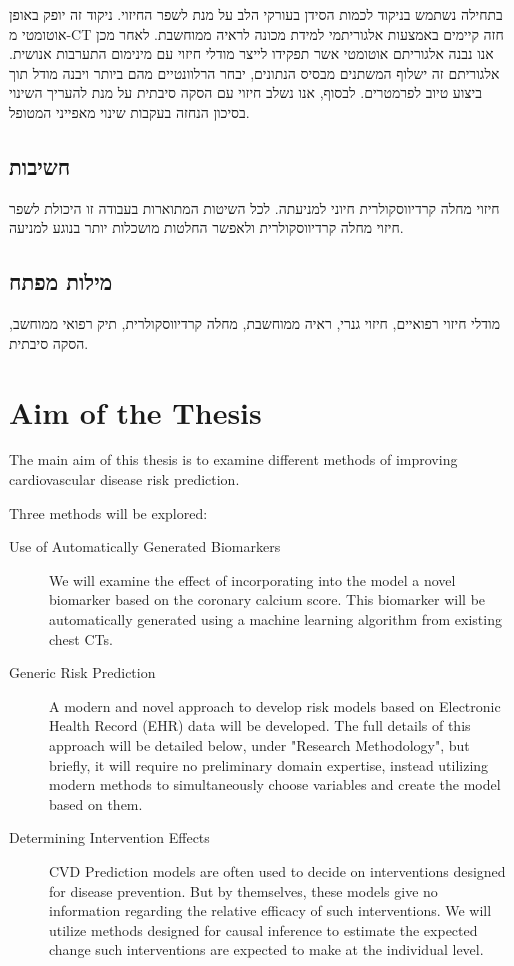 \documentclass[a4paper,12pt]{article}
\begin{document}
\begin{hebrew}
		בתחילה נשתמש בניקוד לכמות הסידן בעורקי הלב על מנת לשפר החיזוי. ניקוד זה יופק באופן אוטומטי מ-CT חזה קיימים באמצעות אלגוריתמי למידת מכונה לראיה ממוחשבת. לאחר מכן אנו נבנה אלגוריתם אוטומטי אשר תפקידו לייצר מודלי חיזוי עם מינימום התערבות אנושית. אלגוריתם זה ישלוף המשתנים מבסיס הנתונים, יבחר הרלוונטיים מהם ביותר ויבנה מודל תוך ביצוע טיוב לפרמטרים. לבסוף, אנו נשלב חיזוי עם הסקה סיבתית על מנת להעריך השינוי בסיכון הנחזה בעקבות שינוי מאפייני המטופל.

		\subsection{\texthebrew{חשיבות}}
		
		חיזוי מחלה קרדיווסקולרית חיוני למניעתה. לכל השיטות המתוארות בעבודה זו היכולת לשפר חיזוי מחלה קרדיווסקולרית ולאפשר החלטות מושכלות יותר בנוגע למניעה. 
			
			\subsection{\texthebrew{מילות מפתח}}
			
			מודלי חיזוי רפואיים, חיזוי גנרי, ראיה ממוחשבת, מחלה קרדיווסקולרית, תיק רפואי ממוחשב, הסקה סיבתית.
		
	\end{hebrew}
	
	\section{Aim of the Thesis}
	
	The main aim of this thesis is to examine different methods of improving cardiovascular disease risk prediction.
	
	Three methods will be explored:
	\begin{description}
		
		\item[Use of Automatically Generated Biomarkers] We will examine the effect of incorporating into the model a novel biomarker based on the coronary calcium score. This biomarker will be automatically generated using a machine learning algorithm from existing chest CTs.
		
		\item[Generic Risk Prediction] A modern and novel approach to develop risk models based on Electronic Health Record (EHR) data will be developed. The full details of this approach will be detailed below, under "Research Methodology", but briefly, it will require no preliminary domain expertise, instead utilizing modern methods to simultaneously choose variables and create the model based on them.
		
		\item[Determining Intervention Effects] CVD Prediction models are often used to decide on interventions designed for disease prevention. But by themselves, these models give no information regarding the relative efficacy of such interventions. We will utilize methods designed for causal inference to estimate the expected change such interventions are expected to make at the individual level.
		
	\end{description}
	
\end{document}
